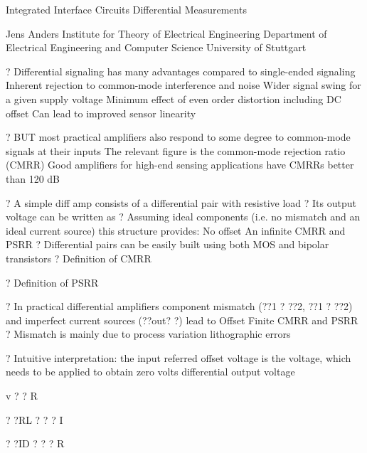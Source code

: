 \documentclass[2pt,landscape]{article}
\begin{document}
\begin{multicols*}{5}
Integrated Interface Circuits \textbullet 
Differential Measurements


Jens Anders
Institute for Theory of Electrical Engineering 
Department of Electrical Engineering and Computer 
Science
University of Stuttgart



?	Differential signaling has many advantages compared to single-ended 
signaling
\textbullet 	Inherent rejection to common-mode interference and noise
\textbullet 	Wider signal swing for a given supply voltage
\textbullet 	Minimum effect of even order distortion including DC offset
\textbullet 	Can lead to improved sensor linearity


?	BUT most practical amplifiers also respond to some degree to 
common-mode signals at their inputs
\textbullet 	The relevant figure is the common-mode rejection ratio (CMRR)
\textbullet 	Good amplifiers for high-end sensing applications have CMRRs better than 
120 dB



?	A simple diff amp consists of a differential pair with resistive load
?	Its output voltage can be written as
?	Assuming ideal components (i.e. no mismatch
and an ideal current source) this structure provides:
\textbullet 	No offset
\textbullet 	An infinite CMRR and PSRR
?	Differential pairs can be easily built using both MOS 
and bipolar transistors
?	Definition of CMRR


?	Definition of PSRR



?	In practical differential amplifiers component mismatch (??1 ? ??2, ??1 ?
??2) and imperfect current sources (??out? ?) lead to
\textbullet 	Offset
\textbullet 	Finite CMRR and PSRR
?	Mismatch is mainly due to process variation lithographic errors





?	Intuitive interpretation:
the input referred offset voltage is the voltage, which needs to be 
applied to obtain zero volts differential output voltage











v	? ? R


? ?RL ? ? ? I




? ?ID ? ? ? R





\end{multicols*}
\end{document}
